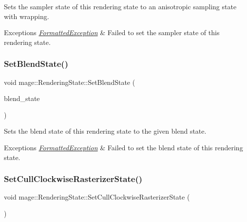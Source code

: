 Sets the sampler state of this rendering state to an anisotropic sampling state with wrapping.


\begin{DoxyExceptions}{Exceptions}
{\em \hyperlink{structmage_1_1_formatted_exception}{Formatted\+Exception}} & Failed to set the sampler state of this rendering state. \\
\hline
\end{DoxyExceptions}
\hypertarget{structmage_1_1_rendering_state_a6f5c6b0bf031db9c3cf255356b4f383a}{}\label{structmage_1_1_rendering_state_a6f5c6b0bf031db9c3cf255356b4f383a} 
\subsubsection{\texorpdfstring{Set\+Blend\+State()}{SetBlendState()}}
{\footnotesize\ttfamily void mage\+::\+Rendering\+State\+::\+Set\+Blend\+State (\begin{DoxyParamCaption}\item[{I\+D3\+D11\+Blend\+State $\ast$}]{blend\+\_\+state }\end{DoxyParamCaption})}

Sets the blend state of this rendering state to the given blend state.


\begin{DoxyExceptions}{Exceptions}
{\em \hyperlink{structmage_1_1_formatted_exception}{Formatted\+Exception}} & Failed to set the blend state of this rendering state. \\
\hline
\end{DoxyExceptions}
\hypertarget{structmage_1_1_rendering_state_a707034239265916d82e7dbe168f09cb6}{}\label{structmage_1_1_rendering_state_a707034239265916d82e7dbe168f09cb6} 
\subsubsection{\texorpdfstring{Set\+Cull\+Clockwise\+Rasterizer\+State()}{SetCullClockwiseRasterizerState()}}
{\footnotesize\ttfamily void mage\+::\+Rendering\+State\+::\+Set\+Cull\+Clockwise\+Rasterizer\+State (\begin{DoxyParamCaption}{ }\end{DoxyParamCaption})}


